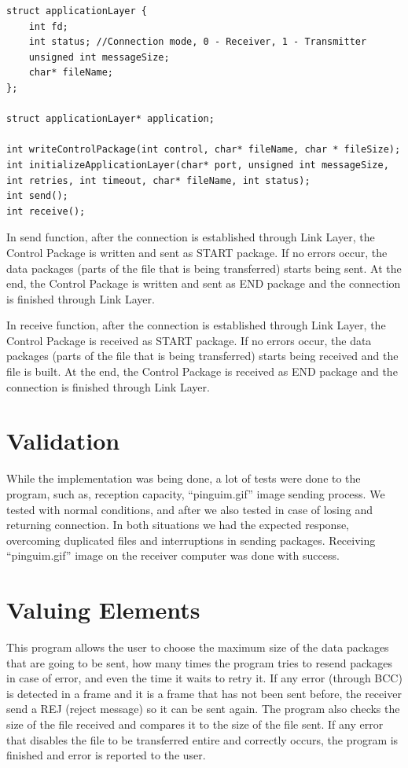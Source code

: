 \documentclass[a4paper]{article}
\begin{document}
\begin{lstlisting}
struct applicationLayer {
    int fd;
    int status; //Connection mode, 0 - Receiver, 1 - Transmitter
    unsigned int messageSize;
    char* fileName;
};

struct applicationLayer* application;

int writeControlPackage(int control, char* fileName, char * fileSize);
int initializeApplicationLayer(char* port, unsigned int messageSize, int retries, int timeout, char* fileName, int status);
int send();
int receive();
\end{lstlisting}

In send function, after the connection is established through Link Layer, the Control Package is written and sent as START package. If no errors occur, the data packages (parts of the file that is being transferred) starts being sent. At the end, the Control Package is written and sent as END package and the connection is finished through Link Layer.

In receive function, after the connection is established through Link Layer, the Control Package is received as START package. If no errors occur, the data packages (parts of the file that is being transferred) starts being received and the file is built. At the end, the Control Package is received as END package and the connection is finished through Link Layer.

\section{Validation}

While the implementation was being done, a lot of tests were done to the program, such as, reception capacity, “pinguim.gif” image sending process. We tested with normal conditions, and after we also tested in case of losing and returning connection. In both situations we had the expected response, overcoming duplicated files and
interruptions in sending packages. Receiving “pinguim.gif” image on the receiver computer was done with success.

\section{Valuing Elements}

This program allows the user to choose the maximum size of the data packages that are going to be sent, how many times the program tries to resend packages in case of error, and even the time it waits to retry it. If any error (through BCC) is detected in a frame and it is a frame that has not been sent before, the receiver send a REJ (reject message) so it can be sent again. The program also checks the size of the file received and compares it to the size of the file sent. If any error that disables the file to be transferred entire and correctly occurs, the program is finished and error is reported to the user.
\end{document}
